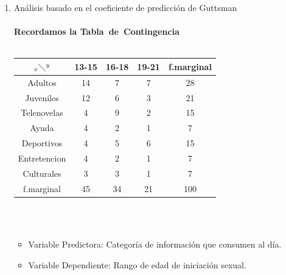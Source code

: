 \documentclass[letterpaper,spanish,11pt]{article}
\begin{document}
\begin{itemize}
\begin{enumerate}
\item An\'alisis basado en el coeficiente de predicci\'on de Guttsman\\\\
	\textbf{Recordamos la Tabla\ de\ Contingencia}\\\\
        \begin{tabular}[c]{|c|c c c|c|}
        \hline
        $_x\diagdown ^{y}$ & 13-15 & 16-18 & 19-21 & f.marginal \\
        \hline
        Adultos & 14 & 7 & 7 & 28 \\
        Juveniles & 12 & 6 & 3 & 21 \\
        Telenovelas & 4 & 9 & 2 & 15 \\
        Ayuda & 4 & 2 & 1 & 7 \\
        Deportivos & 4 & 5 & 6 & 15 \\
        Entretencion & 4 & 2 & 1 & 7 \\
        Culturales & 3 & 3 & 1 & 7 \\
	\hline
        f.marginal & 45 & 34 & 21 & 100 \\
        \hline
        \end{tabular}\\ \\
	


\begin{itemize}
	\item Variable Predictora: Categor\'ia de informaci\'on que consumen al d\'ia.\\
	\item Variable Dependiente: Rango de edad de iniciaci\'on sexual.\\ \\
\end{itemize}
%
%
	

\end{enumerate}
\end{itemize}
\end{document}
